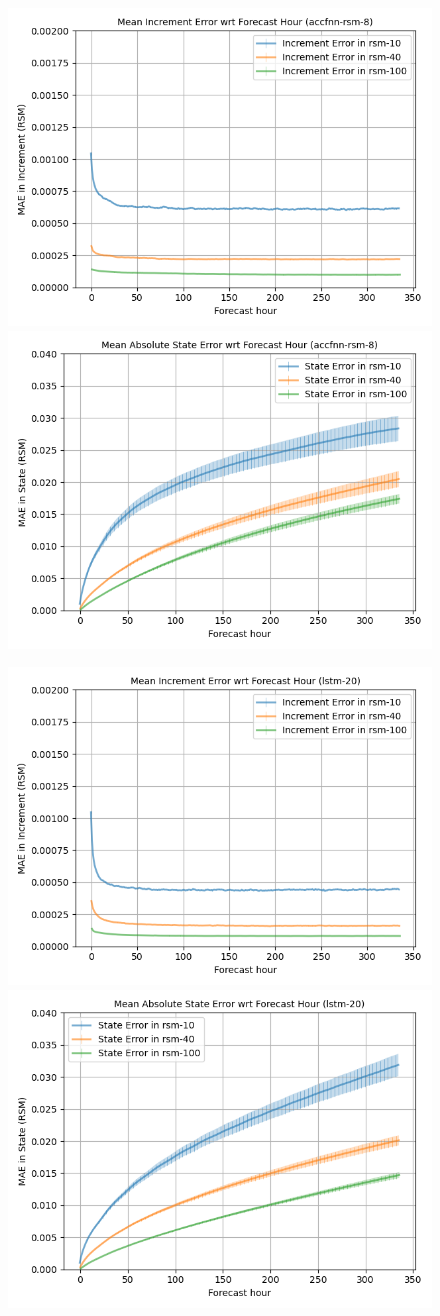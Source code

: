 \begin{figure}[hp!]
    \centering

    \includegraphics[width=.42\linewidth,draft=false]{figures/horizons/eval_best-redo_accfnn-rsm-8_rsm_horizon_na_res.png}
    \includegraphics[width=.42\linewidth,draft=false]{figures/horizons/eval_best-redo_accfnn-rsm-8_rsm_horizon_na_state.png}

    \includegraphics[width=.42\linewidth,draft=false]{figures/horizons/eval_best-redo_lstm-20_rsm_horizon_na_res.png}
    \includegraphics[width=.42\linewidth,draft=false]{figures/horizons/eval_best-redo_lstm-20_rsm_horizon_na_state.png}


\end{figure}
